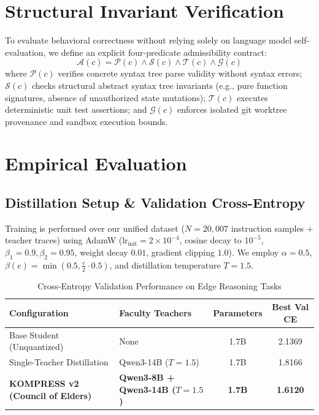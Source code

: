\documentclass[11pt,a4paper]{article}
\begin{document}
\section{Structural Invariant Verification}
To evaluate behavioral correctness without relying solely on language model self-evaluation, we define an explicit four-predicate admissibility contract:
\begin{equation}
    \mathcal{A}(c) = \mathcal{P}(c) \land \mathcal{S}(c) \land \mathcal{T}(c) \land \mathcal{G}(c)
\end{equation}
where $\mathcal{P}(c)$ verifies concrete syntax tree parse validity without syntax errors; $\mathcal{S}(c)$ checks structural abstract syntax tree invariants (e.g., pure function signatures, absence of unauthorized state mutations); $\mathcal{T}(c)$ executes deterministic unit test assertions; and $\mathcal{G}(c)$ enforces isolated git worktree provenance and sandbox execution bounds.

\section{Empirical Evaluation}

\subsection{Distillation Setup \& Validation Cross-Entropy}
Training is performed over our unified dataset ($N = 20,007$ instruction samples + teacher traces) using AdamW ($\text{lr}_{\text{init}} = 2 \times 10^{-4}$, cosine decay to $10^{-5}$, $\beta_1 = 0.9, \beta_2 = 0.95$, weight decay $0.01$, gradient clipping $1.0$). We employ $\alpha = 0.5$, $\beta(e) = \min(0.5, \frac{e}{2} \cdot 0.5)$, and distillation temperature $T = 1.5$.

\begin{table}[h]
\centering
\caption{Cross-Entropy Validation Performance on Edge Reasoning Tasks}
\label{tab:results}
\begin{tabular}{@{}llcc@{}}
\toprule
\textbf{Configuration} & \textbf{Faculty Teachers} & \textbf{Parameters} & \textbf{Best Val CE} \\
\midrule
Base Student (Unquantized) & None & 1.7B & 2.1369 \\
Single-Teacher Distillation & Qwen3-14B ($T=1.5$) & 1.7B & 1.8166 \\
\textbf{KOMPRESS v2 (Council of Elders)} & \textbf{Qwen3-8B + Qwen3-14B ($T=1.5$)} & \textbf{1.7B} & \textbf{1.6120} \\
\bottomrule
\end{tabular}
\end{table}
\end{document}
